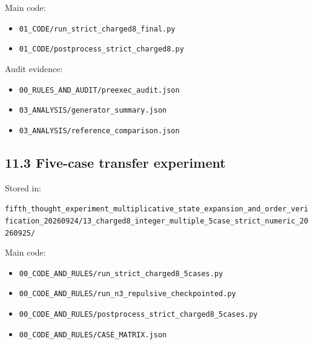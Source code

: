\documentclass[
  a4paper,
]{article}
\providecommand{\tightlist}{%
  \setlength{\itemsep}{0pt}\setlength{\parskip}{0pt}}
\begin{document}
Main code:

\begin{itemize}
\tightlist
\item
  \texttt{01\_\allowbreak{}CODE/\allowbreak{}run\_\allowbreak{}strict\_\allowbreak{}charged8\_\allowbreak{}final.py}
\item
  \texttt{01\_\allowbreak{}CODE/\allowbreak{}postprocess\_\allowbreak{}strict\_\allowbreak{}charged8.py}
\end{itemize}

Audit evidence:

\begin{itemize}
\tightlist
\item
  \texttt{00\_\allowbreak{}RULES\_\allowbreak{}AND\_\allowbreak{}AUDIT/\allowbreak{}preexec\_\allowbreak{}audit.json}
\item
  \texttt{03\_\allowbreak{}ANALYSIS/\allowbreak{}generator\_\allowbreak{}summary.json}
\item
  \texttt{03\_\allowbreak{}ANALYSIS/\allowbreak{}reference\_\allowbreak{}comparison.json}
\end{itemize}

\subsection{11.3 Five-case transfer
experiment}\label{five-case-transfer-experiment}

Stored in:

\texttt{fifth\_\allowbreak{}thought\_\allowbreak{}experiment\_\allowbreak{}multiplicative\_\allowbreak{}state\_\allowbreak{}expansion\_\allowbreak{}and\_\allowbreak{}order\_\allowbreak{}verification\_\allowbreak{}20260924/\allowbreak{}13\_\allowbreak{}charged8\_\allowbreak{}integer\_\allowbreak{}multiple\_\allowbreak{}5case\_\allowbreak{}strict\_\allowbreak{}numeric\_\allowbreak{}20260925/\allowbreak{}}

Main code:

\begin{itemize}
\tightlist
\item
  \texttt{00\_\allowbreak{}CODE\_\allowbreak{}AND\_\allowbreak{}RULES/\allowbreak{}run\_\allowbreak{}strict\_\allowbreak{}charged8\_\allowbreak{}5cases.py}
\item
  \texttt{00\_\allowbreak{}CODE\_\allowbreak{}AND\_\allowbreak{}RULES/\allowbreak{}run\_\allowbreak{}n3\_\allowbreak{}repulsive\_\allowbreak{}checkpointed.py}
\item
  \texttt{00\_\allowbreak{}CODE\_\allowbreak{}AND\_\allowbreak{}RULES/\allowbreak{}postprocess\_\allowbreak{}strict\_\allowbreak{}charged8\_\allowbreak{}5cases.py}
\item
  \texttt{00\_\allowbreak{}CODE\_\allowbreak{}AND\_\allowbreak{}RULES/\allowbreak{}CASE\_\allowbreak{}MATRIX.json}
\end{itemize}
\end{document}
